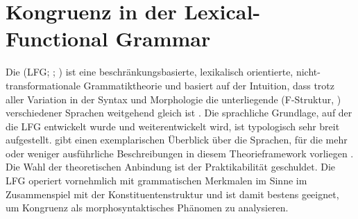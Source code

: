 
\section{Kongruenz in der Lexical-Functional Grammar}
\label{sec:lfgkongr}

Die  (LFG;
\cites{kaplanbresnan1982,bresnan2001,bresnanetal2016}; \cites[zur Einführung
z.\,B.][]{buttking2015}[223--246]{mueller2023}) ist eine
beschränkungsbasierte, lexikalisch orientierte,
nicht-trans\allowbreak{}formationale Grammatiktheorie und basiert auf der
Intuition, dass trotz aller Variation in der Syntax und Morphologie die
unterliegende  (F-Struktur,
) verschiedener Sprachen weitgehend gleich ist
\autocite[42]{bresnanetal2016}.
Die sprachliche Grundlage, auf der die LFG entwickelt wurde und
weiterentwickelt wird, ist typologisch sehr breit aufgestellt.
\citet[223--224]{mueller2023} gibt einen exemplarischen Überblick über die
Sprachen, für die mehr oder weniger ausführliche Beschreibungen in diesem
Theorieframework vorliegen \autocites[zum modernen Standarddeutschen
vgl.][]{berman2003}{fortmann2006}. Die Wahl der theoretischen Anbindung ist der
Praktikabilität geschuldet. Die LFG operiert vornehmlich mit grammatischen
Merkmalen im Sinne  im Zusammenspiel mit der
Konstituentenstruktur und ist damit bestens geeignet, um Kongruenz als
morphosyntaktisches Phänomen zu analysieren.

